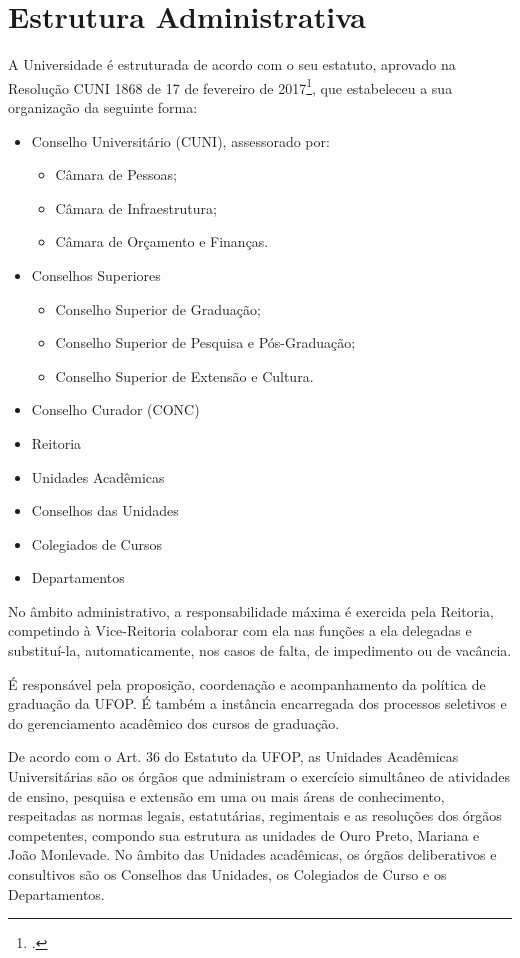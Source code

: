 \documentclass[
	12pt,				%
	openright,			%
	oneside,			%
	a4paper,			%
	english,			%
	brazil				%
	]{abntex2}
\begin{document}
\section{Estrutura Administrativa}
A Universidade é estruturada de acordo com o  seu estatuto, aprovado na Resolução CUNI 1868 de 17 de fevereiro de 2017\footcite{resolucao-cuni-1868}, que estabeleceu a sua organização da seguinte forma:
\begin{itemize}
    \item Conselho Universitário (CUNI), assessorado por:
    \begin{itemize}
      \item Câmara de Pessoas;
      \item Câmara de Infraestrutura;
      \item Câmara de Orçamento e Finanças.
    \end{itemize}
    \item Conselhos Superiores
    \begin{itemize}
        \item Conselho Superior de Graduação;
        \item Conselho Superior de Pesquisa e Pós-Graduação;
        \item Conselho Superior de Extensão e Cultura.
    \end{itemize}
    \item Conselho Curador (CONC)
    \item Reitoria
    \item Unidades Acadêmicas
    \item Conselhos das Unidades
    \item Colegiados de Cursos
    \item Departamentos
\end{itemize}

No âmbito administrativo, a responsabilidade máxima é exercida pela Reitoria, competindo à Vice-Reitoria colaborar com ela nas funções a ela delegadas e substituí-la, automaticamente, nos casos de falta, de impedimento ou de vacância.

É responsável pela proposição, coordenação e acompanhamento da política de graduação da UFOP. É também a instância encarregada dos processos seletivos e do gerenciamento acadêmico dos cursos de graduação.

De acordo com o Art. 36 do Estatuto da UFOP, as Unidades Acadêmicas Universitárias são os órgãos que administram o exercício simultâneo de atividades de ensino, pesquisa e extensão em uma ou mais áreas de conhecimento, respeitadas as normas legais, estatutárias, regimentais e as resoluções dos órgãos competentes, compondo sua estrutura as unidades de Ouro Preto, Mariana e João Monlevade. No âmbito das Unidades acadêmicas, os órgãos deliberativos e consultivos são os Conselhos das Unidades, os Colegiados de Curso e os Departamentos.
%
\end{document}
